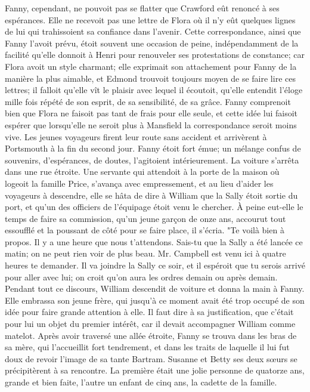 Fanny, cependant, ne pouvoit pas se flatter que Crawford eût renoncé à ses espérances. Elle ne recevoit pas une lettre de Flora où il n'y eût quelques lignes de lui qui trahissoient sa confiance dans l'avenir. Cette correspondance, ainsi que Fanny l'avoit prévu, étoit souvent une occasion de peine, indépendamment de la facilité qu'elle donnoit à Henri pour renouveler ses protestations de constance; car Flora avoit un style charmant; elle exprimait son attachement pour Fanny de la manière la plus aimable, et Edmond trouvoit toujours moyen de se faire lire ces lettres; il falloit qu'elle vît le plaisir avec lequel il écoutoit, qu'elle entendit l'éloge\setcounter{page}{382} mille fois répété de son esprit, de sa sensibilité, de sa grâce. Fanny comprenoit bien que Flora ne faisoit pas tant de frais pour elle seule, et cette idée lui faisoit espérer que lorsqu'elle ne seroit plus à Mansfield la correspondance seroit moins vive.
Les jeunes voyageurs firent leur route sans accident et arrivèrent à Portsmouth à la fin du second jour. Fanny étoit fort émue; un mélange confus de souvenirs, d'espérances, de doutes, l'agitoient intérieurement. La voiture s'arrêta dans une rue étroite. Une servante qui attendoit à la porte de la maison où logeoit la famille Price, s'avança avec empressement, et au lieu d'aider les voyageurs à descendre, elle se hâta de dire à William que la Sally étoit sortie du port, et qu'un des officiers de l'équipage étoit venu le chercher. À peine eut-elle le temps de faire sa commission, qu'un jeune garçon de onze ans, accourut tout essoufflé et la poussant de côté pour se faire place, il s'écria. "Te voilà bien à propos. Il y a une heure que nous t'attendons. Sais-tu que la Sally a été lancée ce matin; on ne peut rien voir de plus beau. Mr. Campbell est venu ici à quatre heures te demander. Il va joindre la Sally ce soir, et il espéroit que tu serois arrivé pour aller avec lui; on croit qu'on aura les ordres\setcounter{page}{383} demain ou après demain. Pendant tout ce discours, William descendit de voiture et donna la main à Fanny. Elle embrassa son jeune frère, qui jusqu'à ce moment avait été trop occupé de son idée pour faire grande attention à elle. Il faut dire à sa justification, que c'était pour lui un objet du premier intérêt, car il devait accompagner William comme matelot. Après avoir traversé une allée étroite, Fanny se trouva dans les bras de sa mère, qui l'accueillit fort tendrement, et dans les traits de laquelle il lui fut doux de revoir l'image de sa tante Bartram.
Susanne et Betty ses deux sœurs se précipitèrent à sa rencontre. La première était une jolie personne de quatorze ans, grande et bien faite, l'autre un enfant de cinq ans, la cadette de la famille.
